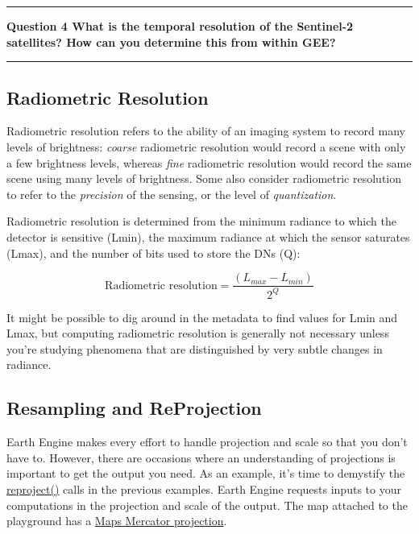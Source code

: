 \documentclass[
]{article}
\begin{document}
\begin{center}\rule{0.5\linewidth}{0.5pt}\end{center}

\textbf{Question 4 What is the temporal resolution of the Sentinel-2 satellites? How can you determine this from within GEE? }

\begin{center}\rule{0.5\linewidth}{0.5pt}\end{center}

\hypertarget{radiometric-resolution}{%
\subsection{Radiometric Resolution}\label{radiometric-resolution}}

Radiometric resolution refers to the ability of an imaging system to record many levels of brightness: \emph{coarse} radiometric resolution would record a scene with only a few brightness levels, whereas \emph{fine} radiometric resolution would record the same scene using many levels of brightness. Some also consider radiometric resolution to refer to the \emph{precision} of the sensing, or the level of \emph{quantization}.

Radiometric resolution is determined from the minimum radiance to which the detector is sensitive (Lmin), the maximum radiance at which the sensor saturates (Lmax), and the number of bits used to store the DNs (Q):

\[  \text{Radiometric resolution} = \frac{(L_{max} - L_{min})}{2^Q} \]

It might be possible to dig around in the metadata to find values for Lmin and Lmax, but computing radiometric resolution is generally not necessary unless you're studying phenomena that are distinguished by very subtle changes in radiance.

\hypertarget{resampling-and-reprojection}{%
\subsection{Resampling and ReProjection}\label{resampling-and-reprojection}}

Earth Engine makes every effort to handle projection and scale so that you don't have to. However, there are occasions where an understanding of projections is important to get the output you need. As an example, it's time to demystify the \href{https://developers.google.com/earth-engine/apidocs/ee-image-reproject}{reproject()} calls in the previous examples. Earth Engine requests inputs to your computations in the projection and scale of the output. The map attached to the playground has a \href{http://epsg.io/3857}{Maps Mercator projection}.
\end{document}
